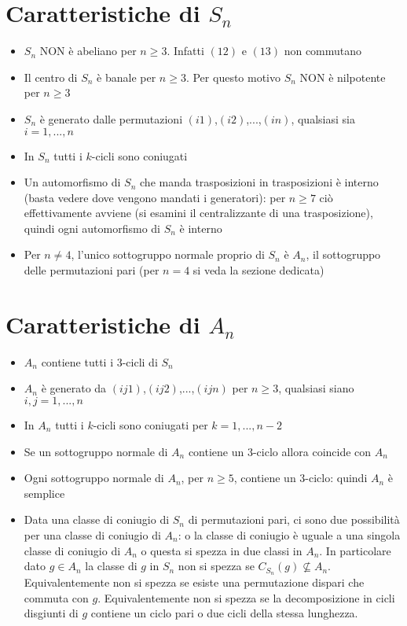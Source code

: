\documentclass[a4paper,NoNotes,GeneralMath]{stdmdoc}
\begin{document}
	\section*{Caratteristiche di $S_n$}
	\begin{itemize}
		\item $S_n$ NON è abeliano per $n \ge 3$. Infatti $(1 2)$ e $(1 3)$ non commutano
		\item Il centro di $S_n$ è banale per $n \ge 3$. Per questo motivo $S_n$ NON è nilpotente per $n \ge 3$
		\item $S_n$ è generato dalle permutazioni $(i 1)$,$(i 2)$,...,$(i n)$, qualsiasi sia $i = {1,...,n}$
		\item In $S_n$ tutti i $k$-cicli sono coniugati
		\item Un automorfismo di $S_n$ che manda trasposizioni in trasposizioni è interno (basta vedere dove vengono mandati i generatori): per $n \ge 7$ ciò effettivamente avviene (si esamini il 			centralizzante di una trasposizione), quindi ogni automorfismo di $S_n$ è interno
		\item Per $n \ne 4$, l'unico sottogruppo normale proprio di $S_n$ è $A_n$, il sottogruppo delle permutazioni pari (per $n=4$ si veda la sezione dedicata)
	\end{itemize}

	\section*{Caratteristiche di $A_n$}
	\begin{itemize}
		\item $A_n$ contiene tutti i $3$-cicli di $S_n$
		\item $A_n$ è generato da $(i j 1)$,$(i j 2)$,...,$(i j n)$ per $n \ge 3$, qualsiasi siano $i,j = {1,...,n}$
		\item In $A_n$ tutti i $k$-cicli sono coniugati per $k = {1,...,n-2}$
		\item Se un sottogruppo normale di $A_n$ contiene un $3$-ciclo allora coincide con $A_n$
		\item Ogni sottogruppo normale di $A_n$, per $n \ge 5$, contiene un $3$-ciclo: quindi $A_n$ è semplice
		\item Data una classe di coniugio di $S_n$ di permutazioni pari, ci sono due possibilità per una classe di coniugio di $A_n$: o la classe di coniugio è uguale a una singola classe di coniugio di $A_n$ o questa si spezza in due classi in $A_n$. In particolare dato $g \in A_n$ la classe di $g$ in $S_n$ non si spezza se $C_{S_n}(g) \nsubseteq A_n$. Equivalentemente non si spezza se esiste una permutazione dispari che commuta con $g$. Equivalentemente non si spezza se la decomposizione in cicli disgiunti di $g$ contiene un ciclo pari o due cicli della stessa lunghezza.
	\end{itemize}
\end{document}
